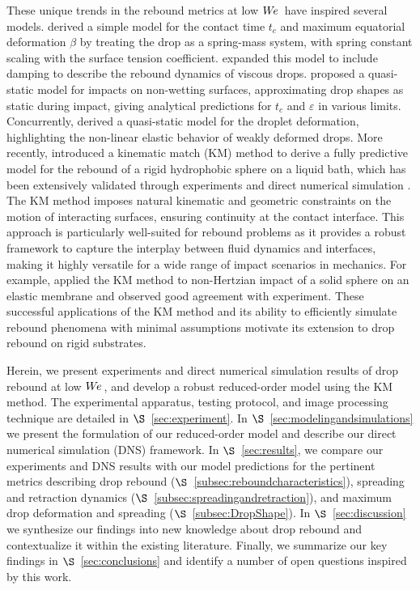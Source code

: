 \documentclass{jfm}
\newcommand{\We}{W\kern-0.15em e\,}
\begin{document}
These unique trends in the rebound metrics at low $\We$ have inspired several models. \citet{okumura2003water} derived a simple model for the contact time $t_{c}$ and maximum equatorial deformation $\beta$ by treating the drop as a spring-mass system, with spring constant scaling with the surface tension coefficient. \citet{jha2020viscous} expanded this model to include damping to describe the rebound dynamics of viscous drops. \citet{molavcek2012quasi} proposed a quasi-static model for impacts on non-wetting surfaces, approximating drop shapes as static during impact, giving analytical predictions for $t_c$ and $\varepsilon$ in various limits. Concurrently, \citet{chevy2012liquid} derived a quasi-static model for the droplet deformation, highlighting the non-linear elastic behavior of weakly deformed drops. More recently, \citet{galeano2017non} introduced a kinematic match (KM) method to derive a fully predictive model for the rebound of a rigid hydrophobic sphere on a liquid bath, which has been extensively validated through experiments and direct numerical simulation \citep{galeano2017non,galeano2019quasi,galeano2021capillary}. The KM method imposes natural kinematic and geometric constraints on the motion of interacting surfaces, ensuring continuity at the contact interface. This approach is particularly well-suited for rebound problems as it provides a robust framework to capture the interplay between fluid dynamics and interfaces, making it highly versatile for a wide range of impact scenarios in mechanics. For example, \citet{aguero2022impact} applied the KM method to non-Hertzian impact of a solid sphere on an elastic membrane and observed good agreement with experiment. These successful applications of the KM method and its ability to efficiently simulate rebound phenomena with minimal assumptions motivate its extension to drop rebound on rigid substrates.

Herein, we present experiments and direct numerical simulation results of drop rebound at low $\We$, and develop a robust reduced-order model using the KM method. The experimental apparatus, testing protocol, and image processing technique are detailed in $\S$~\ref{sec:experiment}. In $\S$~\ref{sec:modelingandsimulations} we present the formulation of our reduced-order model and describe our direct numerical simulation (DNS) framework. In $\S$~\ref{sec:results}, we compare our experiments and DNS results with our model predictions for the pertinent metrics describing drop rebound ($\S$~\ref{subsec:reboundcharacteristics}), spreading and retraction dynamics ($\S$~\ref{subsec:spreadingandretraction}), and maximum drop deformation and spreading ($\S$~\ref{subsec:DropShape}). In $\S$~\ref{sec:discussion} we synthesize our findings into new knowledge about drop rebound and contextualize it within the existing literature. Finally, we summarize our key findings in $\S$~\ref{sec:conclusions} and identify a number of open questions inspired by this work.
\end{document}
